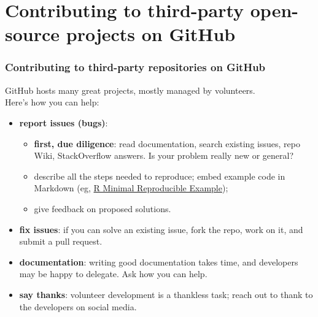 \documentclass[10pt,svgnames,handout]{beamer}
\begin{document}
\section{Contributing to third-party open-source projects on GitHub}
\begin{frame}
\frametitle{Contributing to third-party repositories on GitHub}
GitHub hosts many great projects, mostly managed by volunteers. \\
\medskip
\pause
Here's how you can help:
\begin{itemize}[<+->]
\item \textbf{report issues (bugs)}: 
\begin{itemize}
  \item \textbf{first, due diligence}: read documentation, search existing issues, repo Wiki, StackOverflow answers. Is your problem really new or general?
  \item describe all the steps needed to reproduce; embed example code in Markdown (eg, \href{https://stackoverflow.com/questions/5963269/how-to-make-a-great-r-reproducible-example}{R Minimal Reproducible Example});
  \item give feedback on proposed solutions.
\end{itemize}
\item \textbf{fix issues}: if you can solve an existing issue, fork the repo, work on it, and submit a pull request.
\item \textbf{documentation}: writing good documentation takes time, and developers may be happy to delegate. Ask how you can help.
\item \textbf{say thanks}: volunteer development is a thankless task; reach out to thank to the developers on social media.
\end{itemize}
\end{frame}
\end{document}

